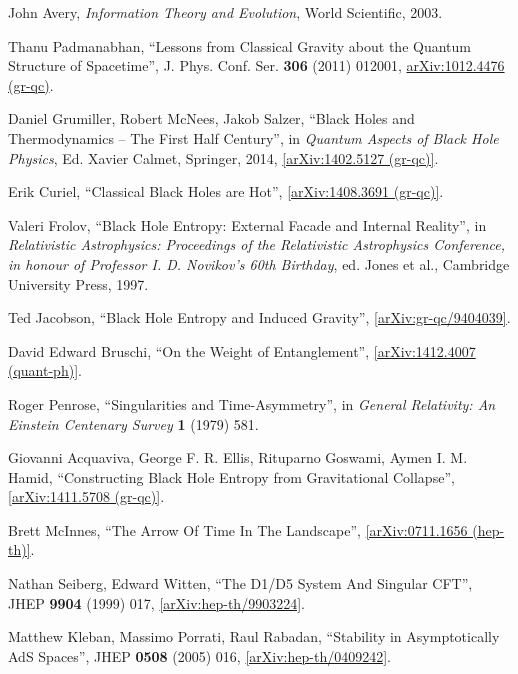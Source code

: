 \documentclass[12pt]{article}
\newcommand{\2}{$^2$}
\newcommand{\3}{$^3$}
\newcommand{\4}{$_4$}
\newcommand{\5}{$_5$}
\begin{document}
\begin{thebibliography}{400}
John Avery, \emph{Information Theory and Evolution}, World Scientific, 2003.

Thanu Padmanabhan, ``Lessons from Classical Gravity about the Quantum Structure of Spacetime'', J. Phys. Conf. Ser. \textbf{306} (2011) 012001, \href{http://arxiv.org/abs/1012.4476}{arXiv:1012.4476 (gr-qc)}.

Daniel Grumiller, Robert McNees, Jakob Salzer, ``Black Holes and Thermodynamics -- The First Half Century'', in \emph{ Quantum Aspects of Black Hole Physics}, Ed. Xavier Calmet, Springer, 2014, \href{http://arxiv.org/abs/1402.5127}{[arXiv:1402.5127 (gr-qc)]}.

Erik Curiel, ``Classical Black Holes are Hot'', \href{http://arxiv.org/abs/1408.3691}{[arXiv:1408.3691 (gr-qc)]}.

Valeri Frolov, ``Black Hole Entropy: External Facade and Internal Reality'', in \emph{Relativistic Astrophysics: Proceedings of the Relativistic Astrophysics Conference, in honour of Professor I. D.  Novikov's 60th Birthday}, ed. Jones et al., Cambridge University Press, 1997.

Ted Jacobson, ``Black Hole Entropy and Induced Gravity'', \href{http://arxiv.org/abs/gr-qc/9404039}{[arXiv:gr-qc/9404039]}.

David Edward Bruschi, ``On the Weight of Entanglement'', \href{http://arxiv.org/abs/1412.4007}{[arXiv:1412.4007 (quant-ph)]}.

Roger Penrose, ``Singularities and Time-Asymmetry'', in \emph{General Relativity: An Einstein Centenary Survey} \textbf{1} (1979) 581.

Giovanni Acquaviva, George F. R. Ellis, Rituparno Goswami, Aymen I. M. Hamid, ``Constructing Black Hole Entropy from Gravitational Collapse'', \href{http://arxiv.org/abs/1411.5708}{[arXiv:1411.5708 (gr-qc)]}.

Brett McInnes, ``The Arrow Of Time In The Landscape'', \href{http://arxiv.org/abs/0711.1656}{[arXiv:0711.1656 (hep-th)]}.


Nathan Seiberg, Edward Witten, ``The D1/D5 System And Singular CFT'',
JHEP \textbf{9904} (1999) 017, \href{http://arxiv.org/abs/hep-th/9903224}{[arXiv:hep-th/9903224]}.

Matthew Kleban, Massimo Porrati, Raul Rabadan, ``Stability in Asymptotically AdS Spaces'', JHEP \textbf{0508} (2005) 016, \href{http://arxiv.org/abs/hep-th/0409242}{[arXiv:hep-th/0409242]}.


\end{thebibliography}
\end{document}

